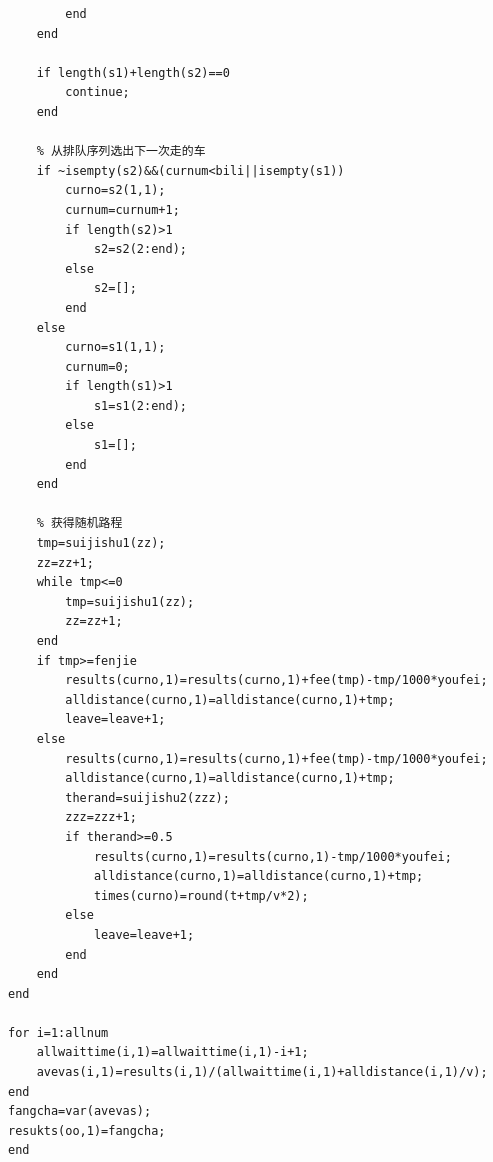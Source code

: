 \documentclass{cumcm}
\begin{document}
\begin{lstlisting}
        end
    end
    
    if length(s1)+length(s2)==0
        continue;
    end
    
    % 从排队序列选出下一次走的车
    if ~isempty(s2)&&(curnum<bili||isempty(s1))
        curno=s2(1,1);
        curnum=curnum+1;
        if length(s2)>1
            s2=s2(2:end);
        else
            s2=[];
        end
    else
        curno=s1(1,1);
        curnum=0;
        if length(s1)>1
            s1=s1(2:end);
        else
            s1=[];
        end
    end
   
    % 获得随机路程
    tmp=suijishu1(zz);
    zz=zz+1;
    while tmp<=0
        tmp=suijishu1(zz);
        zz=zz+1;
    end
    if tmp>=fenjie
        results(curno,1)=results(curno,1)+fee(tmp)-tmp/1000*youfei;
        alldistance(curno,1)=alldistance(curno,1)+tmp;
        leave=leave+1;
    else
        results(curno,1)=results(curno,1)+fee(tmp)-tmp/1000*youfei;
        alldistance(curno,1)=alldistance(curno,1)+tmp;
        therand=suijishu2(zzz);
        zzz=zzz+1;
        if therand>=0.5
            results(curno,1)=results(curno,1)-tmp/1000*youfei;
            alldistance(curno,1)=alldistance(curno,1)+tmp;
            times(curno)=round(t+tmp/v*2);
        else
            leave=leave+1;
        end
    end
end

for i=1:allnum
    allwaittime(i,1)=allwaittime(i,1)-i+1;
    avevas(i,1)=results(i,1)/(allwaittime(i,1)+alldistance(i,1)/v);
end
fangcha=var(avevas);
resukts(oo,1)=fangcha;
end
\end{lstlisting}
\end{document}
